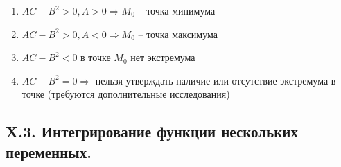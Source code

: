 \documentclass[12pt]{article}
\begin{document}
\begin{enumerate}
        \begin{enumerate}
            \item $AC - B^2 > 0, A > 0 \Longrightarrow M_0$ -- точка минимума
            \item $AC - B^2 > 0, A < 0 \Longrightarrow M_0$ -- точка максимума
            \item $AC - B^2 < 0$ в точке $M_0$ нет экстремума
            \item $AC - B^2 = 0\Longrightarrow$ нельзя утверждать наличие или отсутствие экстремума в точке (требуются дополнительные исследования)
        \end{enumerate}

    \end{enumerate}

    \subsection{X.3. Интегрирование функции нескольких переменных.}
\end{document}
